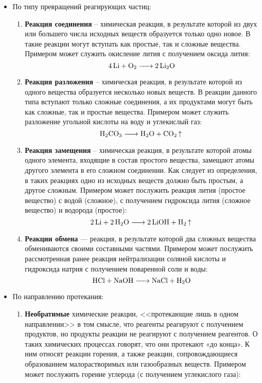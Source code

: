 \begin{itemize}
    \item По типу превращений реагирующих частиц: 
    \begin{enumerate}
        \item \textbf{Реакция соединения} -- химическая реакция, в результате которой из двух или большего числа исходных веществ образуется только одно новое. В такие реакции могут вступать как простые, так и сложные вещества. Примером может служить окисление лития с получением оксида лития:
        \begin{equation*}
            \ce{4Li + O2 -> 2Li2O}
        \end{equation*}
        \item \textbf{Реакция разложения} -- химическая реакция, в результате которой из одного вещества образуется несколько новых веществ. В реакции данного типа вступают только сложные соединения, а их продуктами могут быть как сложные, так и простые вещества. Примером может служить разложение угольной кислоты на воду и углекислый газ:
        \begin{equation*}
            \ce{H2CO3 -> H2O + CO2 ^}
        \end{equation*}
        \item \textbf{Реакция замещения} -- химическая реакция, в результате которой атомы одного элемента, входящие в состав простого вещества, замещают атомы другого элемента в его сложном соединении. Как следует из определения, в таких реакциях одно из исходных веществ должно быть простым, а другое сложным. Примером может послужить реакция лития (простое вещество) с водой (сложное), с получением гидроксида лития (сложное вещество) и водорода (простое):
        \begin{equation*}
            \ce{2Li + 2H2O -> 2LiOH + H2 ^}
        \end{equation*}
        \item \textbf{Реакции обмена} — реакция, в результате которой два сложных вещества обмениваются своими составными частями. Примером может послужить рассмотренная ранее реакция нейтрализации соляной кислоты и гидроксида натрия с получением поваренной соли и воды:
\begin{equation}
    \ce{HCl + NaOH -> NaCl + H2O}
\end{equation}
    \end{enumerate}
    \item По направлению протекания:
    \begin{enumerate}
        \item \textbf{Необратимые} химические реакции, <<протекающие лишь в одном направлении>>  в том смысле, что реагенты реагируют с получением продуктов, но продукты реакции не реагируют с получением реагентов.  О таких химических процессах говорят, что они протекают «до конца». К ним относят реакции горения, а также реакции, сопровождающиеся образованием малорастворимых или газообразных веществ. Примером может послужить горение углерода (с получением углекислого газа):

\end{enumerate}
\end{itemize}
